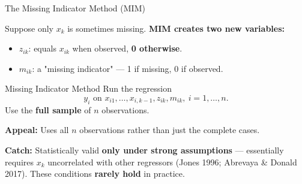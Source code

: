 \documentclass[aspectratio=169, 12pt]{beamer}
\begin{document}
\begin{frame}[shrink=15]{The Missing Indicator Method (MIM)}

  Suppose only $x_k$ is sometimes missing. \textbf{MIM creates two new variables:}
  \begin{itemize}\setlength{\itemsep}{1pt}
    \item $z_{ik}$: equals $x_{ik}$ when observed, \textbf{0 otherwise}.
    \item $m_{ik}$: a "missing indicator" — 1 if missing, 0 if observed.
  \end{itemize}

  \begin{definitionbox}{Missing Indicator Method}
    Run the regression
    \[
      y_i \text{ on } x_{i1}, \ldots, x_{i,k-1}, z_{ik}, m_{ik},\ i = 1, \ldots, n.
    \]
    Use the \textbf{full sample} of $n$ observations.
  \end{definitionbox}

  \begin{keybox}
    \textbf{Appeal:} Uses all $n$ observations rather than just the complete cases.

    \medskip
    \textbf{Catch:} Statistically valid \textbf{only under strong assumptions} — essentially
    requires $x_k$ uncorrelated with other regressors (Jones 1996; Abrevaya \& Donald 2017).
    These conditions \textbf{rarely hold} in practice.
  \end{keybox}

\end{frame}
\end{document}
